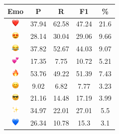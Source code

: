 \documentclass{article}
\begin{document}
\begin{table}
\centering
\begin{tabular}{|c|ccc|c|} \hline
\textbf{Emo} & \textbf{P} & \textbf{R} & \textbf{F1} & \textbf{\%} \\ \hline
\includegraphics[height=0.37cm,width=0.37cm]{img/red_heart.png} & 37.94 & 62.58 & 47.24 & 21.6\\ 
\includegraphics[height=0.37cm,width=0.37cm]{img/smiling_face_with_hearteyes.png} & 28.14 & 30.04 & 29.06 & 9.66\\ 
\includegraphics[height=0.37cm,width=0.37cm]{img/face_with_tears_of_joy.png} & 37.82 & 52.67 & 44.03 & 9.07\\ 
\includegraphics[height=0.37cm,width=0.37cm]{img/two_hearts.png} & 17.35 & 7.75 & 10.72 & 5.21\\ 
\includegraphics[height=0.37cm,width=0.37cm]{img/fire.png} & 53.76 & 49.22 & 51.39 & 7.43\\ 
\includegraphics[height=0.37cm,width=0.37cm]{img/smiling_face_with_smiling_eyes.png} & 9.02 & 6.82 & 7.77 & 3.23\\ 
\includegraphics[height=0.37cm,width=0.37cm]{img/smiling_face_with_sunglasses.png} & 21.16 & 14.48 & 17.19 & 3.99\\ 
\includegraphics[height=0.37cm,width=0.37cm]{img/sparkles.png} & 34.97 & 22.01 & 27.01 & 5.5\\ 
\includegraphics[height=0.37cm,width=0.37cm]{img/blue_heart.png} & 26.34 & 10.78 & 15.3 & 3.1\\ 

\end{tabular}
\end{table}
\end{document}
